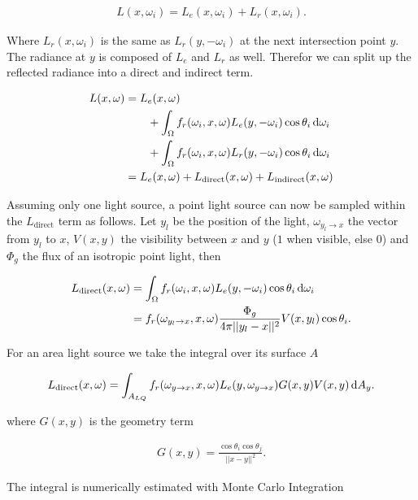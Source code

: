 \begin{align}
L(x, \omega_i) = L_e(x, \omega_i) + L_r(x, \omega_i).
\end{align}

Where $L_r(x, \omega_i)$ is the same as $L_r(y, -\omega_i)$ at the next intersection point $y$. The radiance at $y$ is composed of $L_e$ and $L_r$ as well. Therefor we can split up the reflected radiance into a direct and indirect term.

\begin{align}
L(x, \omega) &= L_e(x, \omega) \\
& \qquad + \int_{\Omega}f_r(\omega_i, x, \omega) L_e(y, -\omega_i)\cos\theta_i \mathop{}\!\mathrm{d}\omega_i \\
& \qquad + \int_{\Omega}f_r(\omega_i, x, \omega) L_r(y, -\omega_i)\cos\theta_i \mathop{}\!\mathrm{d}\omega_i \\
&= L_e(x,\omega) + L_{\text{direct}}(x, \omega) + L_{\text{indirect}}(x,\omega)
\end{align}

Assuming only one light source, a point light source can now be sampled within the $L_{\text{direct}}$ term as follows. Let $y_l$ be the position of the light, $\omega_{y_l\rightarrow x}$ the vector from $y_l$ to $x$, $V(x,y)$ the visibility between $x$ and $y$ ($1$ when visible, else $0$) and $\Phi_g$ the flux of an isotropic point light, then 

\begin{align}
L_{\text{direct}}(x, \omega) &= \int_{\Omega}f_r(\omega_i, x, \omega) L_e(y, -\omega_i)\cos\theta_i \mathop{}\!\mathrm{d}\omega_i \\
&= f_r(\omega_{y_l\rightarrow x}, x, \omega) \frac{\Phi_g}{4\pi||y_l-x||^2} V(x, y_l) \cos\theta_i.
\end{align}

For an area light source we take the integral over its surface $A$

\begin{align}
L_{\text{direct}}(x, \omega) = \int_{A_{LQ}}f_r(\omega_{y \rightarrow x}, x, \omega) L_e(y, \omega_{y \rightarrow x}) G(x,y)V(x,y) \mathop{}\!\mathrm{d} A_y.
\end{align}

where $G(x, y)$ is the geometry term

\begin{align}
G(x,y) = \frac{\cos\theta_i\cos\theta_j}{||x-y||^2}.
\end{align}

The integral is numerically estimated with Monte Carlo Integration

